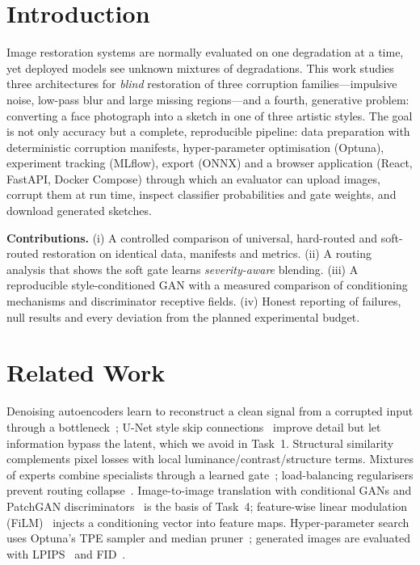\documentclass[conference]{IEEEtran}
\begin{document}
\section{Introduction}
Image restoration systems are normally evaluated on one degradation at a time, yet deployed models see unknown mixtures of degradations. This work studies three architectures for \emph{blind} restoration of three corruption families---impulsive noise, low-pass blur and large missing regions---and a fourth, generative problem: converting a face photograph into a sketch in one of three artistic styles. The goal is not only accuracy but a complete, reproducible pipeline: data preparation with deterministic corruption manifests, hyper-parameter optimisation (Optuna), experiment tracking (MLflow), export (ONNX) and a browser application (React, FastAPI, Docker Compose) through which an evaluator can upload images, corrupt them at run time, inspect classifier probabilities and gate weights, and download generated sketches.

\textbf{Contributions.} (i) A controlled comparison of universal, hard-routed and soft-routed restoration on identical data, manifests and metrics. (ii) A routing analysis that shows the soft gate learns \emph{severity-aware} blending. (iii) A reproducible style-conditioned GAN with a measured comparison of conditioning mechanisms and discriminator receptive fields. (iv) Honest reporting of failures, null results and every deviation from the planned experimental budget.

\section{Related Work}
Denoising autoencoders learn to reconstruct a clean signal from a corrupted input through a bottleneck~\cite{vincent2008}; U-Net style skip connections~\cite{ronneberger2015} improve detail but let information bypass the latent, which we avoid in Task~1. Structural similarity~\cite{wang2004} complements pixel losses with local luminance/contrast/structure terms. Mixtures of experts combine specialists through a learned gate~\cite{shazeer2017}; load-balancing regularisers prevent routing collapse~\cite{shazeer2017,fedus2021}. Image-to-image translation with conditional GANs and PatchGAN discriminators~\cite{mirza2014,isola2017} is the basis of Task~4; feature-wise linear modulation (FiLM)~\cite{perez2018} injects a conditioning vector into feature maps. Hyper-parameter search uses Optuna's TPE sampler and median pruner~\cite{akiba2019}; generated images are evaluated with LPIPS~\cite{zhang2018} and FID~\cite{heusel2017}.
\end{document}
